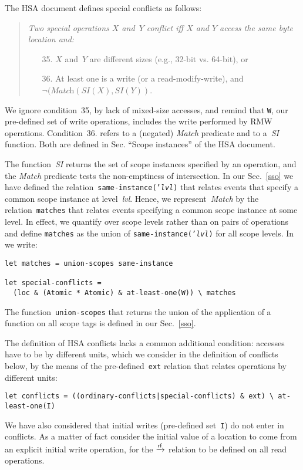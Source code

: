 \documentclass[a4paper]{article}
\begin{document}
The HSA document defines special conflicts as follows:
\begin{quote}\em
 Two special operations $X$ and~$Y$ conflict iff $X$ and $Y$ access
the same byte location and:
\begin{itemize}
\item[35.] $X$ and~$Y$ are different sizes (e.g., 32-bit vs. 64-bit), or
\item[36.] At least one is a write (or a read-modify-write),
and $\neg(\textit{Match}(\textit{SI}(X), \textit{SI}(Y))$.
\end{itemize}
\end{quote}
We ignore condition~35, by lack of mixed-size accesses,
and remind that \verb+W+, our pre-defined set of write operations,
includes the write performed by RMW operations.
Condition~36. refers to a (negated) \textit{Match} predicate
and to a~\textit{SI} function.
Both are defined in Sec. ``Scope instances'' of the HSA document.

The function~\textit{SI} returns the set of scope instances specified by
an operation, and the \textit{Match} predicate
tests the non-emptiness of intersection.
In our Sec.~\ref{sso} we have defined the relation~\texttt{same-instance('\textit{lvl})} that relates events that specify a common scope instance at level~\textit{lvl}. Hence, we represent~\textit{Match} by the relation~\verb+matches+
that relates events specifying a common scope instance at some level.
In effect, we quantify over scope levels rather than on pairs of operations
and  define \verb+matches+ as the union of \texttt{same-instance('\textit{lvl})}
for all scope levels. In \cat{} we write:
\begin{verbatim}
let matches = union-scopes same-instance

let special-conflicts =
  (loc & (Atomic * Atomic) & at-least-one(W)) \ matches
\end{verbatim}
The function~\verb+union-scopes+ that returns the union of
the application of a function on all scope tags is defined
in our Sec.~\ref{sso}.

The definition of HSA conflicts lacks a common additional condition:
accesses have to be by different units, which we consider in
the definition of conflicts below, by the means of the pre-defined~\verb+ext+
relation that relates operations by different units:
\begin{verbatim}
let conflicts = ((ordinary-conflicts|special-conflicts) & ext) \ at-least-one(I)
\end{verbatim}
We have also considered that initial writes (pre-defined set~\verb+I+)
do not enter in conflicts.
As a matter of fact \herd{} consider the initial value of a location
to come from an explicit initial write operation, for the $\xrightarrow{\textsf{\scriptsize{}rf}}$ relation to be
defined on all read operations.
\end{document}
